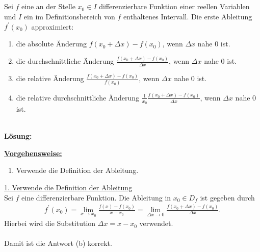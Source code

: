 \newpage

\subsection*{}
Sei $f$ eine an der Stelle $x_0 \in I $ differenzierbare Funktion einer reellen Variablen und $I$ ein im Definitionsbereich von $f$ enthaltenes Intervall. Die erste Ableitung $f^\prime(x_0)$ approximiert: 
\renewcommand{\labelenumi}{(\alph{enumi})}
\begin{enumerate}
	\item 
	die absolute Änderung $f(x_0 + \Delta x) - f(x_0)$, wenn $\Delta x$ nahe $0$ ist.
	\item
	die durchschnittliche Änderung $\frac{f(x_0 + \Delta x) - f(x_0)}{\Delta x}$, wenn $\Delta x$ nahe $0$ ist.
	\item
	die relative Änderung $\frac{f(x_0 + \Delta x) - f(x_0)}{f(x_0)}$, wenn $\Delta x$ nahe $0$ ist.
	\item
	die relative durchschnittliche Änderung $\frac{1}{x_0} \frac{f(x_0 + \Delta x) - f(x_0)}{\Delta x}$, wenn $\Delta x$ nahe $0$ ist.
\end{enumerate}
\ \\
\textbf{Lösung:}
\begin{mdframed}
\underline{\textbf{Vorgehensweise:}}
\renewcommand{\labelenumi}{\theenumi.}
\begin{enumerate}
\item Verwende die Definition der Ableitung.
\end{enumerate}
\end{mdframed}

\underline{1. Verwende die Definition der Ableitung}\\
Sei $f$ eine differenzierbare Funktion. Die Ableitung in $x_0 \in D_f$ ist gegeben durch
\begin{align*}
	f^\prime(x_0) = \lim \limits_{x \to x_0} \frac{f(x) - f(x_0)}{x - x_0}
	= \lim \limits_{\Delta x \to 0 } \frac{f(x_0 + \Delta x)- f(x_0)}{\Delta x}.
\end{align*} 
Hierbei wird die Substitution $\Delta x = x - x_0$ verwendet.\\
\\
Damit ist die Antwort (b) korrekt. 

\newpage
